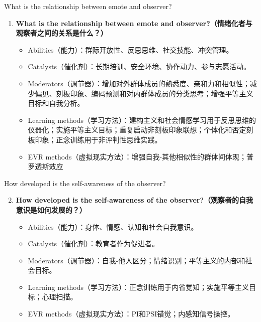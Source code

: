 \documentclass[aspectratio=169,xcolor=dvipsnames]{beamer}
\begin{document}
\begin{frame}{What is the relationship between emote and observer?}
    
    \begin{enumerate}
        \item \textbf{What is the relationship between emote and observer?（情绪化者与观察者之间的关系是什么？）}
        \begin{itemize}
            \item Abilities（能力）：群际开放性、反思思维、社交技能、冲突管理。
            \item Catalysts（催化剂）：长期培训、安全环境、协作动力、参与志愿活动。
            \item Moderators（调节器）：增加对外群体成员的熟悉度、亲和力和相似性；减少偏见、刻板印象、编码预测和对内群体成员的分类思考；增强平等主义目标和自我分析。
            \item Learning methods（学习方法）：建构主义和社会情感学习用于反思思维的仪器化；实施平等主义目标；重复启动非刻板印象联想；个体化和否定刻板印象；正念训练用于非评判性思维实践。
            \item EVR methods（虚拟现实方法）：增强自我-其他相似性的群体间体现；普罗透斯效应
        \end{itemize}
    \end{enumerate}
\end{frame}

\begin{frame}{How developed is the self-awareness of the observer?}
    \begin{enumerate}
        \setcounter{enumi}{1}
        \item \textbf{How developed is the self-awareness of the observer?（观察者的自我意识是如何发展的？）}
        \begin{itemize}
            \item Abilities（能力）：身体、情感、认知和社会自我意识。
            \item Catalysts（催化剂）：教育者作为促进者。
            \item Moderators（调节器）：自我-他人区分；情绪识别；平等主义的内部和社会目标。
            \item Learning methods（学习方法）：正念训练用于内省觉知；实施平等主义目标；心理扫描。
            \item EVR methods（虚拟现实方法）：PI和PSI错觉；内感知信号操控。
        \end{itemize}
    \end{enumerate}
\end{frame}
\end{document}
